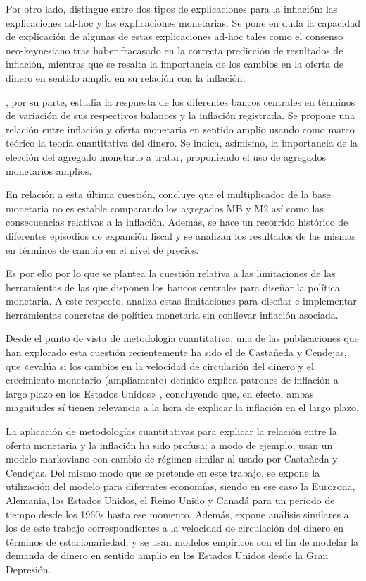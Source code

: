 \documentclass[titlepage, 12pt]{article}
\begin{document}
Por otro lado, \cite{greenwood2021} distingue entre dos tipos de explicaciones para la inflación: las explicaciones ad-hoc y las explicaciones monetarias. Se pone en duda la capacidad de explicación de algunas de estas explicaciones ad-hoc tales como el consenso neo-keynesiano tras haber fracasado en la correcta predicción de resultados de inflación, mientras que se resalta la importancia de los cambios en la oferta de dinero en sentido amplio en su relación con la inflación.

\cite{reynard2023}, por su parte, estudia la respuesta de los diferentes bancos centrales en términos de variación de sus respectivos balances y la inflación registrada. Se propone una relación entre inflación y oferta monetaria en sentido amplio usando como marco teórico la teoría cuantitativa del dinero. Se indica, asimismo, la importancia de la elección del agregado monetario a tratar, proponiendo el uso de agregados monetarios amplios.

En relación a esta última cuestión, \cite{bordo2021} concluye que el multiplicador de la base monetaria no es estable comparando los agregados MB y M2 así como las consecuencias relativas a la inflación. Además, se hace un recorrido histórico de diferentes episodios de expansión fiscal y se analizan los resultados de las mismas en términos de cambio en el nivel de precios.

Es por ello por lo que se plantea la cuestión relativa a las limitaciones de las herramientas de las que disponen los bancos centrales para diseñar la política monetaria. A este respecto, \cite{congdon2021} analiza estas limitaciones para diseñar e implementar herramientas concretas de política monetaria sin conllevar inflación asociada.

Desde el punto de vista de metodología cuantitativa, una de las publicaciones que han explorado esta cuestión recientemente ha sido el de Castañeda y Cendejas, que «evalúa si los cambios en la velocidad de circulación del dinero y el crecimiento monetario (ampliamente) definido explica patrones de inflación a largo plazo en los Estados Unidos» \autocite[2]{castaneda2023}, concluyendo que, en efecto, ambas magnitudes sí tienen relevancia a la hora de explicar la inflación en el largo plazo.

La aplicación de metodologías cuantitativas para explicar la relación entre la oferta monetaria y la inflación ha sido profusa: a modo de ejemplo, \cite{amisano2013} usan un modelo markoviano con cambio de régimen similar al usado por Castañeda y Cendejas. Del mismo modo que se pretende en este trabajo, se expone la utilización del modelo para diferentes economías, siendo en ese caso la Eurozona, Alemania, los Estados Unidos, el Reino Unido y Canadá para un período de tiempo desde los 1960s hasta ese momento. Además, \cite{anderson2017} expone análisis similares a los de este trabajo correspondientes a la velocidad de circulación del dinero en términos de estacionariedad, y se usan modelos empíricos con el fin de modelar la demanda de dinero en sentido amplio en los Estados Unidos desde la Gran Depresión.
\end{document}
